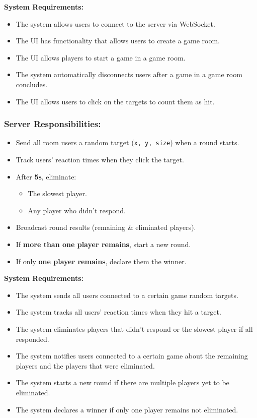 \documentclass[]{VUMIFTemplateClass}
\begin{document}
\textbf{System Requirements:}
\begin{itemize}
    \item The system allows users to connect to the server via WebSocket.
    \item The UI has functionality that allows users to create a game room.
    \item The UI allows players to start a game in a game room.
    \item The system automatically disconnects users after a game in a game room concludes.
    \item The UI allows users to click on the targets to count them as hit.
\end{itemize}

\subsubsection{Server Responsibilities:}
\begin{itemize}
    \item Send all room users a random target (\texttt{x, y, size}) when a round starts.
    \item Track users' reaction times when they click the target.
    \item After \textbf{5s}, eliminate:
    \begin{itemize}
        \item The slowest player.
        \item Any player who didn’t respond.
    \end{itemize}
    \item Broadcast round results (remaining \& eliminated players).
    \item If \textbf{more than one player remains}, start a new round.
    \item If only \textbf{one player remains}, declare them the winner.
\end{itemize}

\textbf{System Requirements:}
\begin{itemize}
    \item The system sends all users connected to a certain game random targets.
    \item The system tracks all users' reaction times when they hit a target.
    \item The system eliminates players that didn't respond or the slowest player if all responded.
    \item The system notifies users connected to a certain game about the remaining players and the players that were eliminated.
    \item The system starts a new round if there are multiple players yet to be eliminated.
    \item The system declares a winner if only one player remains not eliminated.
\end{itemize}
\end{document}
